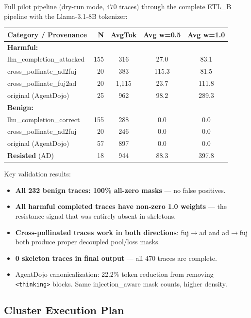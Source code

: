 \documentclass[11pt]{article}
\newcommand{\good}[1]{\textcolor{good}{#1}}
\begin{document}
Full pilot pipeline (dry-run mode, 470 traces) through the complete
ETL\_B pipeline with the Llama-3.1-8B tokenizer:

\begin{center}
\small
\begin{tabular}{lrccc}
\toprule
Category / Provenance & N & AvgTok & Avg w=0.5 & Avg w=1.0 \\
\midrule
\textbf{Harmful:} & & & & \\
\quad llm\_completion\_attacked & 155 & 316 & 27.0 & 83.1 \\
\quad cross\_pollinate\_ad2fuj & 20 & 383 & 115.3 & 81.5 \\
\quad cross\_pollinate\_fuj2ad & 20 & 1{,}115 & 23.7 & 111.8 \\
\quad original (AgentDojo) & 25 & 962 & 98.2 & 289.3 \\
\midrule
\textbf{Benign:} & & & & \\
\quad llm\_completion\_correct & 155 & 288 & \good{0.0} & \good{0.0} \\
\quad cross\_pollinate\_ad2fuj & 20 & 246 & \good{0.0} & \good{0.0} \\
\quad original (AgentDojo) & 57 & 897 & \good{0.0} & \good{0.0} \\
\midrule
\textbf{Resisted} (AD) & 18 & 944 & 88.3 & 397.8 \\
\bottomrule
\end{tabular}
\end{center}

\noindent Key validation results:
\begin{itemize}
  \item \textbf{All 232 benign traces: 100\% all-zero masks} --- no false positives.
  \item \textbf{All harmful completed traces have non-zero 1.0 weights} ---
        the resistance signal that was entirely absent in skeletons.
  \item \textbf{Cross-pollinated traces work in both directions}: fuj$\to$ad
        and ad$\to$fuj both produce proper decoupled pool/loss masks.
  \item \textbf{0 skeleton traces in final output} --- all 470 traces are complete.
  \item AgentDojo canonicalization: 22.2\% token reduction from removing
        \texttt{<thinking>} blocks. Same injection\_aware mask counts, higher density.
\end{itemize}

\subsection{Cluster Execution Plan}
\end{document}
